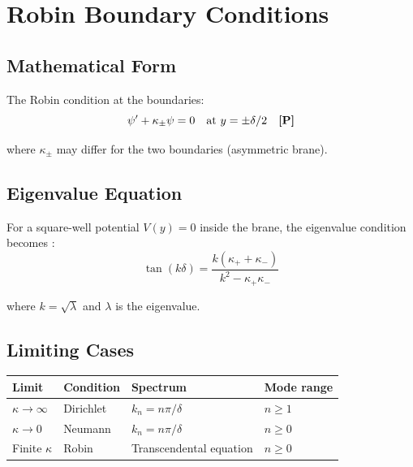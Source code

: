 \section{Robin Boundary Conditions}
\label{sec:robin_bc}

\subsection{Mathematical Form}

The Robin condition at the boundaries:
\begin{equation}
\psi' + \kappa_{\pm} \psi = 0 \quad \text{at } y = \pm\delta/2 \quad \textbf{[P]}
\end{equation}

where $\kappa_{\pm}$ may differ for the two boundaries
(asymmetric brane).

\subsection{Eigenvalue Equation}

For a square-well potential $V(y) = 0$ inside the brane, the eigenvalue
condition becomes \tagDer{}:
\begin{equation}
\tan(k\delta) = \frac{k(\kappa_+ + \kappa_-)}{k^2 - \kappa_+\kappa_-}
\label{eq:robin_eigenvalue}
\end{equation}

where $k = \sqrt{\lambda}$ and $\lambda$ is the eigenvalue.

\subsection{Limiting Cases}

\begin{center}
\begin{tabular}{llll}
\toprule
\textbf{Limit} & \textbf{Condition} & \textbf{Spectrum} & \textbf{Mode range} \\
\midrule
$\kappa \to \infty$ & Dirichlet & $k_n = n\pi/\delta$ & $n \ge 1$ \\
$\kappa \to 0$ & Neumann & $k_n = n\pi/\delta$ & $n \ge 0$ \\
Finite $\kappa$ & Robin & Transcendental equation & $n \ge 0$ \\
\bottomrule
\end{tabular}
\end{center}

